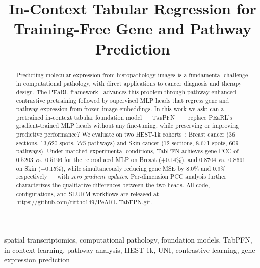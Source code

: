 \documentclass[conference]{IEEEtran}
\begin{document}
\title{In-Context Tabular Regression for Training-Free Gene and Pathway  Prediction}

\author{

}

\maketitle

\begin{abstract}
Predicting molecular expression from histopathology images is a fundamental
challenge in computational pathology, with direct applications to cancer
diagnosis and therapy design.
The PEaRL framework~\cite{pearl2025} advances this problem through
pathway-enhanced contrastive pretraining followed by supervised MLP heads
that regress gene and pathway expression from frozen image embeddings.
In this work we ask: can a pretrained in-context tabular foundation model ---
\textsc{TabPFN}~\cite{tabpfn2023} --- replace PEaRL's gradient-trained MLP
heads without any fine-tuning, while preserving or improving predictive
performance?
We evaluate on two HEST-1k cohorts~\cite{hest1k}: Breast cancer
(36 sections, 13{,}620 spots, 775 pathways) and Skin cancer
(12 sections, 8{,}671 spots, 609 pathways).
Under matched experimental conditions, TabPFN achieves gene PCC of $0.5203$
vs.\ $0.5196$ for the reproduced MLP on Breast (+0.14\%), and $0.8704$
vs.\ $0.8691$ on Skin (+0.15\%), while simultaneously reducing gene MSE by
8.0\% and 0.9\% respectively --- with \emph{zero gradient updates}.
Per-dimension PCC analysis further characterizes the qualitative differences
between the two heads.
All code, configurations, and SLURM workflows are released at
\url{https://github.com/tirtho149/PeARL-TabFPN.git}.
\end{abstract}

\begin{IEEEkeywords}
spatial transcriptomics, computational pathology, foundation models,
TabPFN, in-context learning, pathway analysis, HEST-1k, UNI,
contrastive learning, gene expression prediction
\end{IEEEkeywords}
\end{document}

